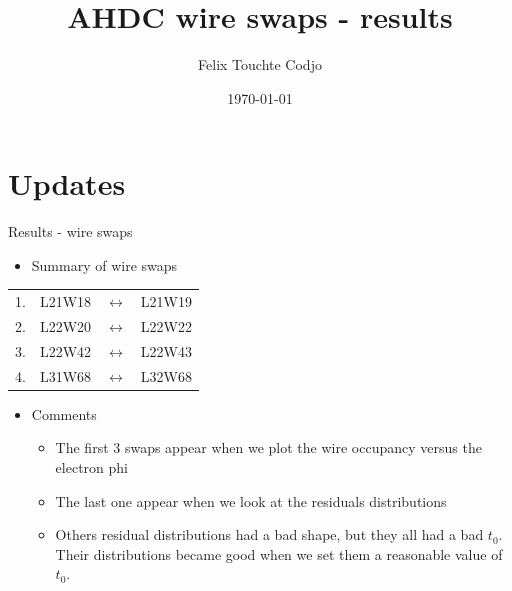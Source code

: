 \documentclass[10pt,aspectratio=43]{beamer}
\title{AHDC wire swaps - results}
\author{Felix Touchte Codjo}
\institute{IJCLab}
\date{\today}
\begin{document}
\begin{frame}[plain] %
\titlepage
\end{frame}


\section{Updates}

\begin{frame}{Results - wire swaps}
    \begin{itemize}
        \item Summary of wire swaps
    \end{itemize}

    \centering
    \vspace{0.2cm}

    \begin{tabular}{cccc}
        1. & L21W18 & $\longleftrightarrow$ & L21W19 \\
        2. & L22W20 & $\longleftrightarrow$ & L22W22 \\
        3. & L22W42 & $\longleftrightarrow$ & L22W43 \\
        4. & L31W68 & $\longleftrightarrow$ & L32W68 \\
    \end{tabular}

    \vspace{0.2cm}
    \begin{itemize}
        \item Comments
        
            \begin{itemize}
                \item The first 3 swaps appear when we plot the wire occupancy versus the electron phi
                \item The last one appear when we look at the residuals distributions
                \item Others residual distributions had a bad shape, but they all had a bad $t_0$. Their distributions became good when we set them a reasonable value of $t_0$.
            \end{itemize}
    \end{itemize}
    
\end{frame}
\end{document}
